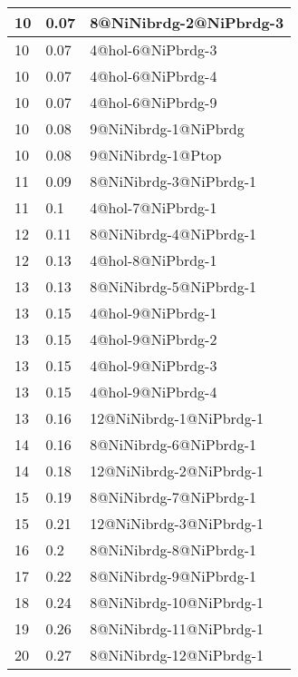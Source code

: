 \begin{center}
\begin{longtable}{|l|l|l|}
10 & 0.07 & 8@NiNibrdg-2@NiPbrdg-3 \\ \hline
10 & 0.07 & 4@hol-6@NiPbrdg-3 \\ \hline
10 & 0.07 & 4@hol-6@NiPbrdg-4 \\ \hline
10 & 0.07 & 4@hol-6@NiPbrdg-9 \\ \hline
10 & 0.08 & 9@NiNibrdg-1@NiPbrdg \\ \hline
10 & 0.08 & 9@NiNibrdg-1@Ptop \\ \hline
11 & 0.09 & 8@NiNibrdg-3@NiPbrdg-1 \\ \hline
11 & 0.1 & 4@hol-7@NiPbrdg-1 \\ \hline
12 & 0.11 & 8@NiNibrdg-4@NiPbrdg-1 \\ \hline
12 & 0.13 & 4@hol-8@NiPbrdg-1 \\ \hline
13 & 0.13 & 8@NiNibrdg-5@NiPbrdg-1 \\ \hline
13 & 0.15 & 4@hol-9@NiPbrdg-1 \\ \hline
13 & 0.15 & 4@hol-9@NiPbrdg-2 \\ \hline
13 & 0.15 & 4@hol-9@NiPbrdg-3 \\ \hline
13 & 0.15 & 4@hol-9@NiPbrdg-4 \\ \hline
13 & 0.16 & 12@NiNibrdg-1@NiPbrdg-1 \\ \hline
14 & 0.16 & 8@NiNibrdg-6@NiPbrdg-1 \\ \hline
14 & 0.18 & 12@NiNibrdg-2@NiPbrdg-1 \\ \hline
15 & 0.19 & 8@NiNibrdg-7@NiPbrdg-1 \\ \hline
15 & 0.21 & 12@NiNibrdg-3@NiPbrdg-1 \\ \hline
16 & 0.2 & 8@NiNibrdg-8@NiPbrdg-1 \\ \hline
17 & 0.22 & 8@NiNibrdg-9@NiPbrdg-1 \\ \hline
18 & 0.24 & 8@NiNibrdg-10@NiPbrdg-1 \\ \hline
19 & 0.26 & 8@NiNibrdg-11@NiPbrdg-1 \\ \hline
20 & 0.27 & 8@NiNibrdg-12@NiPbrdg-1 \\ \hline

\end{longtable}
\end{center}

